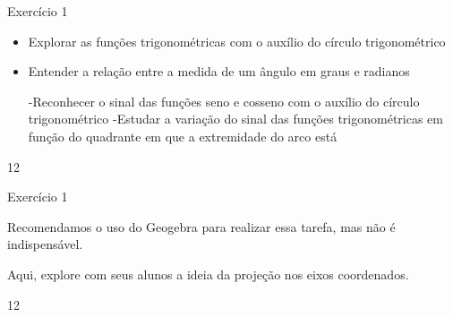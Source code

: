 \clearpage
\def\currentcolor{cor1}
\begin{objectives}{Exercício 1}
{
\begin{itemize}
\item Explorar as funções trigonométricas com o auxílio do círculo
trigonométrico
\item Entender a relação entre a medida de um ângulo em graus e
radianos

-Reconhecer o sinal das funções seno e cosseno com o auxílio
do círculo trigonométrico
-Estudar a variação do sinal das funções trigonométricas em
função do quadrante em que a extremidade do arco está
\end{itemize}
}{1}{2}
\end{objectives}
\begin{sugestions}{Exercício 1}
{
Recomendamos o uso do Geogebra para realizar essa tarefa,
mas não é indispensável.


Aqui, explore com seus alunos a ideia da projeção nos eixos
coordenados.
}{1}{2}
\end{sugestions}
